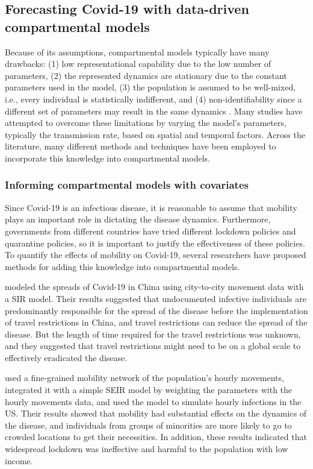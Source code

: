 \subsection{Forecasting Covid-19 with data-driven compartmental models}

Because of its assumptions, compartmental models typically have many drawbacks: (1) low representational capability due to the low number of parameters, (2) the represented dynamics are stationary due to the constant parameters used in the model, (3) the population is assumed to be well-mixed, i.e., every individual is statistically indifferent, and (4) non-identifiability since a different set of parameters may result in the same dynamics \cite{roosaAssessingParameterIdentifiability2019}.
Many studies have attempted to overcome these limitations by varying the model's parameters, typically the transmission rate, based on spatial and temporal factors.
Across the literature, many different methods and techniques have been employed to incorporate this knowledge into compartmental models.

\subsubsection{Informing compartmental models with covariates}

Since Covid-19 is an infectious disease, it is reasonable to assume that mobility plays an important role in dictating the disease dynamics.
Furthermore, governments from different countries have tried different lockdown policies and quarantine policies, so it is important to justify the effectiveness of these policies.
To quantify the effects of mobility on Covid-19, several researchers have proposed methods for adding this knowledge into compartmental models.

\citeauthor{liSubstantialUndocumentedInfection2020} \cite{liSubstantialUndocumentedInfection2020} modeled the spreads of Covid-19 in China using city-to-city movement data with a \gls{SIR} model.
Their results suggested that undocumented infective individuals are predominantly responsible for the spread of the disease before the implementation of travel restrictions in China, and travel restrictions can reduce the spread of the disease.
But the length of time required for the travel restrictions was unknown, and they suggested that travel restrictions might need to be on a global scale to effectively eradicated the disease.

\citeauthor{changMobilityNetworkModels2021} \cite{changMobilityNetworkModels2021} used a fine-grained mobility network of the population's hourly movements, integrated it with a simple \gls{SEIR} model by weighting the parameters with the hourly movements data, and used the model to simulate hourly infections in the US.
Their results showed that mobility had substantial effects on the dynamics of the disease, and individuals from groups of minorities are more likely to go to crowded locations to get their necessities.
In addition, these results indicated that widespread lockdown was ineffective and harmful to the population with low income.

